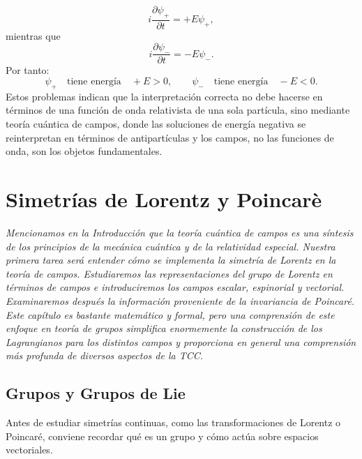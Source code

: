 \documentclass[a4paper,11pt]{book} %
\begin{document}
\begin{equation}
    i\frac{\partial \psi_+}{\partial t}
    =
    +E\psi_+,
\end{equation}
\noindent
mientras que
\begin{equation}
    i\frac{\partial \psi_-}{\partial t}
    =
    -E\psi_-.
\end{equation}
\noindent
Por tanto:
\begin{equation}
    \psi_+
    \quad \text{tiene energía} \quad +E>0,
\qquad
    \psi_-
    \quad \text{tiene energía} \quad -E<0.
\end{equation}
\noindent
Estos problemas indican que la interpretación correcta no debe hacerse en
términos de una función de onda relativista de una sola partícula, sino mediante teoría cuántica de campos, donde las soluciones de energía negativa se reinterpretan en términos de antipartículas y los campos, no las funciones de onda, son los objetos fundamentales.

\chapter{Simetrías de Lorentz y Poincarè}
\noindent
\textit{Mencionamos en la Introducción que la teoría cuántica de campos es una 
síntesis de los principios de la mecánica cuántica y de la relatividad especial. 
Nuestra primera tarea será entender cómo se implementa la simetría de Lorentz en 
la teoría de campos. 
\medskip\newline
Estudiaremos las representaciones del grupo de Lorentz en 
términos de campos e introduciremos los campos escalar, espinorial y vectorial. 
Examinaremos después la información proveniente de la invariancia de Poincaré. 
\medskip\newline
Este capítulo es bastante matemático y formal, pero una comprensión de este enfoque en teoría de grupos simplifica enormemente la construcción de los Lagrangianos para los distintos campos y proporciona en general una comprensión más profunda de diversos 
aspectos de la TCC.}


\section{Grupos y Grupos de Lie}
\noindent
Antes de estudiar simetrías continuas, como las transformaciones de Lorentz o Poincaré, conviene recordar qué es un grupo y cómo actúa sobre espacios
vectoriales. 
\end{document}
